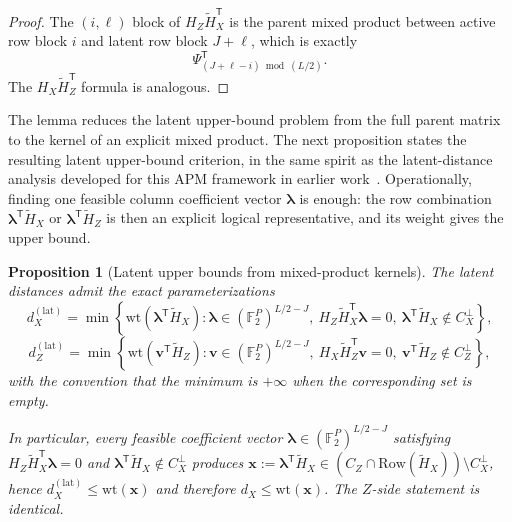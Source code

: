 \documentclass[11pt]{article}
\newcommand{\Ftwo}{\mathbb{F}_2}
\newcommand{\Row}{\mathrm{Row}}
\newcommand{\wt}{\mathrm{wt}}
\newcommand{\Htil}{\tilde{H}}
\newcommand{\vect}[1]{\bm{#1}}
\newcommand{\vx}{\vect{x}}
\newcommand{\vvct}{\vect{v}}
\newcommand{\vlambda}{\vect{\lambda}}
\theoremstyle{uprightthm}
\newtheorem{proposition}[theorem]{Proposition}
\begin{document}
\begin{proof}
The $(i,\ell)$ block of $H_Z\Htil_X^{\mathsf T}$ is the parent mixed product between active row block $i$ and latent row block $J+\ell$, which is exactly
\[
\Psi_{(J+\ell-i)\bmod(L/2)}^{\mathsf T}.
\]
The $H_X\Htil_Z^{\mathsf T}$ formula is analogous.
\end{proof}

The lemma reduces the latent upper-bound problem from the full parent matrix to the kernel of an explicit mixed product. The next proposition states the resulting latent upper-bound criterion, in the same spirit as the latent-distance analysis developed for this APM framework in earlier work~\cite{Kasai2026}. Operationally, finding one feasible column coefficient vector $\vlambda$ is enough: the row combination $\vlambda^{\mathsf T}\Htil_X$ or $\vlambda^{\mathsf T}\Htil_Z$ is then an explicit logical representative, and its weight gives the upper bound.

\begin{proposition}[Latent upper bounds from mixed-product kernels]
\label{prop:latent-upper-en}
The latent distances admit the exact parameterizations
\[
d_X^{(\mathrm{lat})}
=
\min\left\{
\wt(\vlambda^{\mathsf T}\Htil_X):
\vlambda\in(\Ftwo^P)^{L/2-J},\ 
H_Z\Htil_X^{\mathsf T}\vlambda=0,\ 
\vlambda^{\mathsf T}\Htil_X\notin C_X^\perp
\right\},
\]
\[
d_Z^{(\mathrm{lat})}
=
\min\left\{
\wt(\vvct^{\mathsf T}\Htil_Z):
\vvct\in(\Ftwo^P)^{L/2-J},\ 
H_X\Htil_Z^{\mathsf T}\vvct=0,\ 
\vvct^{\mathsf T}\Htil_Z\notin C_Z^\perp
\right\},
\]
with the convention that the minimum is $+\infty$ when the corresponding set is empty.

In particular, every feasible coefficient vector
$\vlambda\in(\Ftwo^P)^{L/2-J}$ satisfying
$H_Z\Htil_X^{\mathsf T}\vlambda=0$ and
$\vlambda^{\mathsf T}\Htil_X\notin C_X^\perp$
produces
$\vx:=\vlambda^{\mathsf T}\Htil_X\in (C_Z\cap \Row(\Htil_X))\setminus C_X^\perp$,
hence $d_X^{(\mathrm{lat})}\le \wt(\vx)$ and therefore $d_X\le \wt(\vx)$.
The $Z$-side statement is identical.
\end{proposition}
\end{document}
